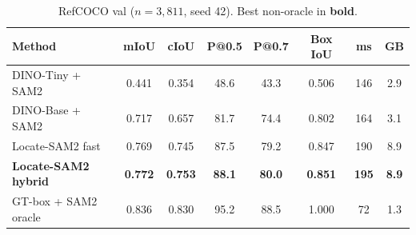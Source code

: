 
\begin{table}[t]
  \centering
  \caption{RefCOCO val ($n{=}3{,}811$, seed 42). Best non-oracle in \textbf{bold}.}
  \label{tab:main}
  \footnotesize
  \setlength{\tabcolsep}{4.8pt}
  \begin{tabular*}{\textwidth}{@{\extracolsep{\fill}}lccccccc@{}}
    \toprule
    Method & mIoU & cIoU & P@0.5 & P@0.7 & Box IoU & ms & GB \\
    \midrule
    DINO-Tiny + SAM2    & 0.441 & 0.354 & 48.6 & 43.3 & 0.506 & 146 & 2.9 \\
    DINO-Base + SAM2    & 0.717 & 0.657 & 81.7 & 74.4 & 0.802 & 164 & 3.1 \\
    Locate-SAM2 fast    & 0.769 & 0.745 & 87.5 & 79.2 & 0.847 & 190 & 8.9 \\
    \textbf{Locate-SAM2 hybrid} & \textbf{0.772} & \textbf{0.753} & \textbf{88.1} & \textbf{80.0} & \textbf{0.851} & \textbf{195} & \textbf{8.9} \\
    GT-box + SAM2 oracle & 0.836 & 0.830 & 95.2 & 88.5 & 1.000 & 72  & 1.3 \\
    \bottomrule
  \end{tabular*}

  \vspace{0.7em}


\end{table}
